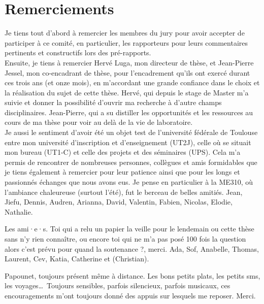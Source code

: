 
\thispagestyle{empty}
\section*{Remerciements}
\adjustmtc

Je tiens tout d'abord à remercier les membres du jury pour avoir accepter de 
participer à ce comité, en particulier, les rapporteurs pour leurs commentaires 
pertinents et constructifs lors des pré-rapports.
\\

Ensuite, je tiens à remercier Hervé Luga, mon directeur de thèse, et Jean-Pierre 
Jessel, mon co-encadrant de thèse, pour l'encadrement qu'ils ont exercé durant 
ces trois ans (et onze mois), en m'accordant une grande confiance dans le choix 
et la réalisation du sujet de cette thèse. 
Hervé, qui depuis le stage de Master m'a suivie et donner la possibilité d'ouvrir 
ma recherche à d'autre champs disciplinaires. Jean-Pierre, qui a su distiller 
les opportunités et les ressources au cours de ma thèse pour voir au delà de la vie 
de 
laboratoire.
\\

Je aussi le sentiment d'avoir été un objet test de l'université fédérale de Toulouse 
entre mon 
université d'inscription et d'enseignement (UT2J), celle où se situait mon bureau 
(UT1-C) et celle des projets et des séminaires (UPS). Cela m'a permis de 
rencontrer de nombreuses personnes, collègues et amis formidables que je tiens 
également à remercier pour leur patience ainsi que pour les longs et passionnés 
échanges que nous avons eus. Je pense en particulier à la ME310, où l'ambiance 
chaleureuse 
(surtout l'été), fut le berceau de belles amitiés. {\color{white} Jean, Jiefu, 
Dennis, Audren, Arianna, David, Valentin, Fabien, Nicolas, Elodie, Nathalie.}

Les ami·e·s. Toi qui a relu un papier la veille pour le lendemain ou cette 
thèse sans n'y rien connaître, ou encore toi qui ne m'a pas posé 100 fois la 
question \og 
alors c'est 
prévu pour quand la soutenance ?\fg{}, merci. {\color{white} Ada, Sof, Anabelle, 
Thomas, 
Laurent, Cev, Katia, Catherine et (Christian).}

Papounet, toujours présent même à distance. Les bons petits plats, les 
petits sms, les voyages\dots~Toujours sensibles, parfois 
silencieux, parfois musicaux, ces encouragements m'ont toujours donné des 
appuis sur lesquels me reposer. Merci.\\

